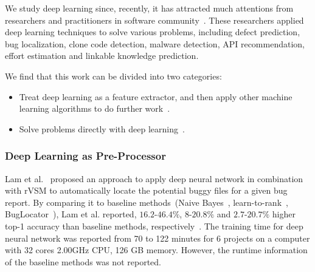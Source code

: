 \documentclass[sigconf]{acmart}
\theoremstyle{break}
\newcommand{\bi}{\begin{itemize}[leftmargin=0.4cm]}
\newcommand{\ei}{\end{itemize}}
\begin{document}
We study deep learning since, recently, it  has attracted 
much attentions from researchers and practitioners in software
 community~\cite{wang2016automatically, gu2016deep, xu2016predicting,white2016deep,white2015toward,lam2015combining,choetkiertikul2016deep,yuan2014droid,mou2016convolutional}.
 These researchers applied  deep learning techniques to solve various problems,
 including defect prediction, bug localization, clone code detection, malware detection, API recommendation, 
 effort estimation and linkable knowledge prediction.
 
We find that this work   can be divided into   two categories:
 
\bi
\item Treat deep learning as a feature extractor, and then apply other  machine learning algorithms to do further work~\cite{lam2015combining,wang2016automatically,choetkiertikul2016deep}.
\item Solve problems directly with  deep learning~\cite{gu2016deep,xu2016predicting,white2016deep,white2015toward,yuan2014droid,mou2016convolutional}.
\ei
\noindent
\subsubsection{Deep Learning as  Pre-Processor}

Lam et al.~\cite{lam2015combining}  proposed an approach to apply deep neural network
 in combination with rVSM to automatically locate the potential buggy files for a given
 bug report. By comparing it to baseline methods~(Naive Bayes~\cite{kim2013should}, learn-to-rank~\cite{ye2014learning}, 
 BugLocator~\cite{zhou2012should}), Lam et al. reported, $\mbox{16.2-46.4}\%$, $\mbox{8-20.8}\%$  and $\mbox{2.7-20.7}\%$ 
 higher top-1 accuracy than baseline methods, respectively~\cite{lam2015combining}. The training time for deep neural
 network was reported from 70 to 122 minutes for 6 projects on a computer with 32 cores 2.00GHz CPU,
 126 GB memory. However,
 the runtime information of the baseline methods was not reported.
 
\end{document}
